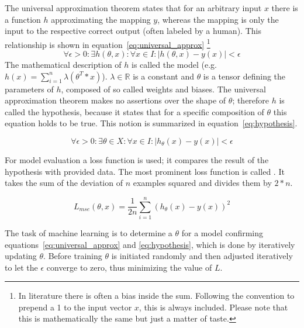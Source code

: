 The universal approximation theorem \cite{Cybenko1989} \cite{Hornik1989} states that for an arbitrary input $x$ there is a function $h$ approximating the mapping $y$, whereas the mapping is only the input to the respective correct output (often labeled by a human).
This relationship is shown in equation~\eqref{eq:universal_approx} \footnote{In literature there is often a bias inside the sum.
Following the convention to prepend a 1 to the input vector $x$, this is always included.
Please note that this is mathematically the same but just a matter of taste.
}
\begin{equation}
    \forall \epsilon > 0 :
    \exists h(\theta, x) : \forall x \in I : | h(\theta, x) - y(x) | < \epsilon
    \label{eq:universal_approx}
\end{equation}
The mathematical description of $h$ is called the model (e.g.  $h(x) = \sum_{i=1}^n{\lambda (\theta^T * x)}$).
$\lambda \in \mathbb{R}$ is a constant and $\theta$ is a tensor defining the parameters of $h$, composed of so called weights and biases. %
The universal approximation theorem makes no assertions over the shape of $\theta$; therefore $h$ is called the hypothesis, because it states that for a specific composition of $\theta$ this equation holds to be true.
This notion is summarized in equation~\eqref{eq:hypothesis}.

\begin{equation}
    \forall \epsilon > 0 : \exists \theta \in X : \forall x \in I : |
    h_\theta(x) - y(x) | < \epsilon
    \label{eq:hypothesis}
\end{equation}

For model evaluation a loss function is used; it compares the result of the hypothesis with provided data.
The most prominent loss function is called .
It takes the sum of the deviation of $n$ examples squared and divides them by $2*n$.

\begin{equation}
    L_{mse}(\theta, x) = \frac{1}{2 n} \sum_{i=1}^n (h_\theta(x) - y(x))^2
    \label{eq:mse}
\end{equation} 

The task of machine learning is to determine a $\theta$ for a model confirming equations~\ref{eq:universal_approx} and \ref{eq:hypothesis}, which is done by iteratively updating $\theta$. 
Before training $\theta$ is initiated randomly and then adjusted iteratively to let the $\epsilon$ converge to zero, thus minimizing the value of $L$.

